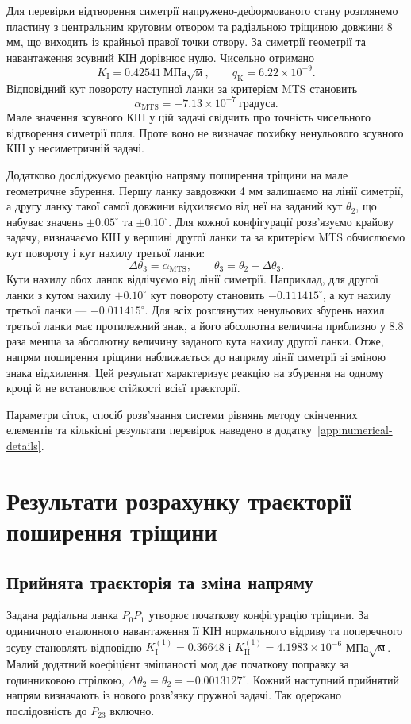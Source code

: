 \documentclass[a4paper,12pt]{article}
\begin{document}
Для перевірки відтворення симетрії напружено-деформованого стану розглянемо пластину з центральним
круговим отвором та радіальною тріщиною довжини 8 мм, що виходить із крайньої правої точки отвору.
За симетрії геометрії та навантаження зсувний КІН дорівнює нулю. Чисельно отримано
\[
 K_{\mathrm I}=0.42541\ \text{МПа}\sqrt{\text{м}},\qquad
 q_{\mathrm K}=6.22\times10^{-9}.
\]
Відповідний кут повороту наступної ланки за критерієм MTS становить
\[
 \alpha_{\mathrm{MTS}}=-7.13\times10^{-7}\ \text{градуса}.
\]
Мале значення зсувного КІН у цій задачі свідчить про точність чисельного відтворення
симетрії поля. Проте воно не визначає похибку ненульового зсувного КІН у несиметричній задачі.

Додатково досліджуємо реакцію напряму поширення тріщини на мале геометричне збурення.
Першу ланку завдовжки 4 мм залишаємо на лінії симетрії, а другу ланку такої самої довжини
відхиляємо від неї на заданий кут $\theta_2$, що набуває значень $\pm0.05^\circ$ та $\pm0.10^\circ$.
Для кожної конфігурації розв’язуємо крайову задачу, визначаємо КІН у вершині другої ланки
та за критерієм MTS обчислюємо кут повороту і кут нахилу третьої ланки:
\[
 \Delta\theta_3=\alpha_{\mathrm{MTS}},\qquad
 \theta_3=\theta_2+\Delta\theta_3.
\]
Кути нахилу обох ланок відлічуємо від лінії симетрії. Наприклад, для другої ланки з кутом
нахилу $+0.10^\circ$ кут повороту становить $-0.111415^\circ$, а кут нахилу третьої ланки
--- $-0.011415^\circ$. Для всіх розглянутих ненульових збурень нахил третьої ланки має
протилежний знак, а його абсолютна величина приблизно у 8.8 раза менша за абсолютну величину
заданого кута нахилу другої ланки. Отже, напрям поширення тріщини наближається до напряму
лінії симетрії зі зміною знака відхилення. Цей результат характеризує реакцію на збурення
на одному кроці й не встановлює стійкості всієї траєкторії.

Параметри сіток, спосіб розв’язання системи рівнянь методу скінченних елементів
та кількісні результати перевірок наведено в додатку~\ref{app:numerical-details}.
\FloatBarrier

\section{Результати розрахунку траєкторії поширення тріщини}
\label{sec:results}
\subsection{Прийнята траєкторія та зміна напряму}
Задана радіальна ланка $P_0P_1$ утворює початкову конфігурацію тріщини. За одиничного еталонного
навантаження її КІН нормального відриву та поперечного зсуву становлять відповідно $K_{\mathrm{I}}^{(1)}=0.36648$ і $K_{\mathrm{II}}^{(1)}=4.1983\times10^{-6}$
МПа$\sqrt{\text{м}}$. Малий додатний коефіцієнт змішаності мод дає початкову поправку за годинниковою стрілкою,
$\Delta\theta_2=\theta_2=-0.0013127^\circ$. Кожний наступний прийнятий напрям визначають із нового розв’язку пружної задачі. Так
одержано послідовність до $P_{23}$ включно.
\end{document}
